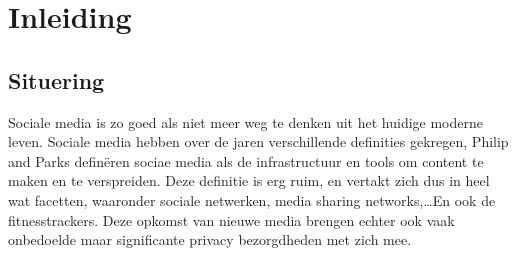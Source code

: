 
\chapter{Inleiding}

\section{Situering}
Sociale media is zo goed als niet meer weg te denken uit het huidige moderne
leven. Sociale media hebben over de jaren verschillende definities gekregen,
Philip and Parks definëren sociae media als de infrastructuur en tools om
content te maken en te verspreiden\cite{PhilipsAndParks}. Deze definitie is erg
ruim, en vertakt zich dus in heel wat facetten, waaronder sociale netwerken,
media sharing networks,\ldots En ook de fitnesstrackers. Deze opkomst van
nieuwe media brengen echter ook vaak onbedoelde maar significante privacy
bezorgdheden met zich mee.\newline

